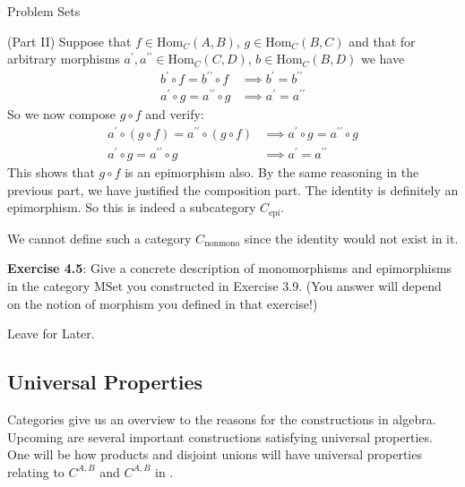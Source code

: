 \documentclass{report}
\begin{document}
\begin{exercises}{Problem Sets}
\begin{answer}
            (Part II) Suppose that $f \in \text{Hom}_{C}(A, B)$, $g \in \text{Hom}_{C}(B, C)$ and that for arbitrary morphisms $a^{\prime}, a^{\prime\prime} \in \text{Hom}_{C}(C, D)$, $b \in \text{Hom}_{C}(B, D)$ we have
                \begin{align*}
                    b^{\prime} \circ f = b^{\prime\prime} \circ f &\implies  b^{\prime} = b^{\prime\prime} \\
                    a^{\prime} \circ g = a^{\prime\prime} \circ g &\implies  a^{\prime} = a^{\prime\prime}   
                \end{align*}
            So we now compose $g \circ f$ and verify:
                \begin{align*}
                    a^{\prime} \circ (g \circ f) = a^{\prime\prime} \circ (g \circ f) &\implies  a^{\prime} \circ g = a^{\prime\prime} \circ g \\
                    a^{\prime} \circ g = a^{\prime\prime} \circ g                     &\implies  a^{\prime} = a^{\prime\prime}                   
                \end{align*}
            This shows that $g \circ f$ is an epimorphism also. By the same reasoning in the previous part, we have justified the composition part. The identity is definitely an epimorphism. So this is indeed a subcategory $C_{\text{epi}}$.

            We cannot define such a category $C_{\text{nonmono}}$ since the identity would not exist in it.
        \end{answer}

    \textbf{Exercise 4.5}: Give a concrete description of monomorphisms and epimorphisms in the category $\text{MSet}$ you constructed in Exercise 3.9. (You answer will depend on the notion of morphism you defined in that exercise!)
        \begin{answer}
            Leave for Later.
        \end{answer}
\end{exercises}

\newpage
\begin{topic}
    \section{Universal Properties}
\end{topic}

Categories give us an overview to the reasons for the constructions in algebra. Upcoming are several important constructions satisfying universal properties. One will be how products and disjoint unions will have universal properties relating to $C^{A, B}$ and $C^{A, B}$ in .
\end{document}

